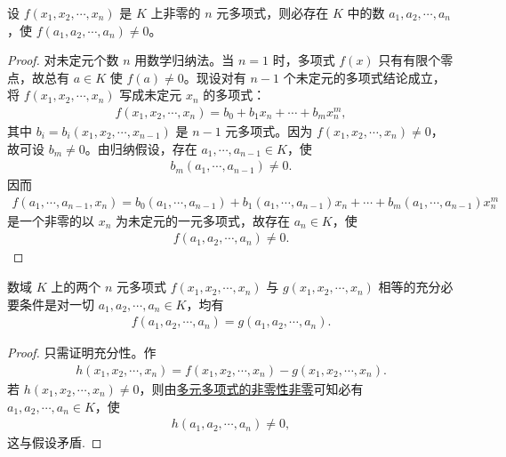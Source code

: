 \documentclass[../../main.tex]{subfiles}%
\begin{document}
\begin{lemma}[多元多项式的非零性]\label{lemma:多元多项式的非零性}
设 \(f(x_1,x_2,\cdots ,x_n)\) 是 \(K\) 上非零的 \(n\) 元多项式，则必存在 \(K\) 中的数 \(a_1,a_2,\cdots ,a_n\)，使 \(f(a_1,a_2,\cdots ,a_n) \ne 0\)。
\end{lemma}
\begin{proof}
对未定元个数 \(n\) 用数学归纳法。当 \(n=1\) 时，多项式 \(f(x)\) 只有有限个零点，故总有 \(a \in K\) 使 \(f(a) \ne 0\)。现设对有 \(n-1\) 个未定元的多项式结论成立，将 \(f(x_1,x_2,\cdots ,x_n)\) 写成未定元 \(x_n\) 的多项式：
\begin{align*}
f(x_1,x_2,\cdots ,x_n) = b_0 + b_1 x_n + \cdots + b_m x_n^m,
\end{align*}
其中 \(b_i = b_i(x_1,x_2,\cdots ,x_{n-1})\) 是 \(n-1\) 元多项式。因为 \(f(x_1,x_2,\cdots ,x_n) \ne 0\)，故可设 \(b_m \ne 0\)。由归纳假设，存在 \(a_1,\cdots ,a_{n-1} \in K\)，使
\begin{align*}
b_m(a_1,\cdots ,a_{n-1}) \ne 0.
\end{align*}
因而
\begin{align*}
f(a_1,\cdots ,a_{n-1},x_n) = b_0(a_1,\cdots ,a_{n-1}) + b_1(a_1,\cdots ,a_{n-1}) x_n + \cdots + b_m(a_1,\cdots ,a_{n-1}) x_n^m
\end{align*}
是一个非零的以 \(x_n\) 为未定元的一元多项式，故存在 \(a_n \in K\)，使
\begin{align*}
f(a_1,a_2,\cdots ,a_n) \ne 0.
\end{align*}
\end{proof}

\begin{proposition}[多元多项式相等的充要条件]\label{proposition:多元多项式相等的充要条件}
数域 \(K\) 上的两个 \(n\) 元多项式 \(f(x_1,x_2,\cdots ,x_n)\) 与 \(g(x_1,x_2,\cdots ,x_n)\) 相等的充分必要条件是对一切 \(a_1,a_2,\cdots ,a_n \in K\)，均有
\begin{align*}
f(a_1,a_2,\cdots ,a_n) = g(a_1,a_2,\cdots ,a_n).
\end{align*}
\end{proposition}
\begin{proof}
只需证明充分性。作
\begin{align*}
h(x_1,x_2,\cdots ,x_n) = f(x_1,x_2,\cdots ,x_n) - g(x_1,x_2,\cdots ,x_n).
\end{align*}
若 \(h(x_1,x_2,\cdots ,x_n) \ne 0\)，则由\hyperref[lemma:多元多项式的非零性]{多元多项式的非零性非零}可知必有 \(a_1,a_2,\cdots ,a_n \in K\)，使
\begin{align*}
h(a_1,a_2,\cdots ,a_n) \ne 0,
\end{align*}
这与假设矛盾.
\end{proof}
\end{document}
